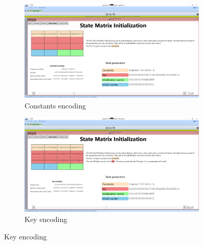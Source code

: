 \begin{figure}
\centering
\begin{subfigure}{0.5\textwidth}
  \centering
  \includegraphics[width=0.99\textwidth]{figures/state-matrix/1-state-matrix-constants}
  \caption{Constants encoding}
  \label{fig:statematrix.encoding.constants}
\end{subfigure}%
\begin{subfigure}{0.5\textwidth}
  \centering
  \includegraphics[width=0.99\textwidth]{figures/state-matrix/2-state-matrix-key}
  \caption{Key encoding}
  \label{fig:statematrix.encoding.key}
\end{subfigure}


\end{figure}
